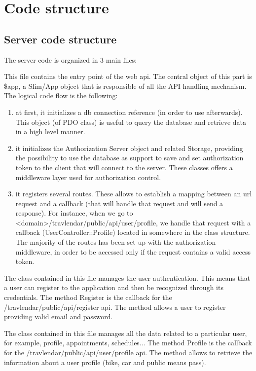 \chapter{Code structure}

\section{Server code structure}
The server code is organized in 3 main files:

This file contains the entry point of the web api. The central object of this part is \$app, a Slim/App object that is responsible of all the API handling mechanism. The logical code flow is the following:

\begin{enumerate}
\item at first, it initializes a db connection reference (in order to use afterwards). This object (of PDO class) is useful to query the database and retrieve data in a high level manner.
\item it initializes the Authorization Server object and related Storage, providing the possibility to use the database as support to save and set authorization token to the client that will connect to the server. These classes offers a middleware layer used for authorization control.
\item it registers several routes. These allows to establish a mapping between an url request and a callback (that will handle that request and will send a response). For instance, when we go to <domain>/travlendar/public/api/user/profile, we handle that request with a callback (UserController::Profile) located in somewhere in the class structure. The majority of the routes has been set up with the authorization middleware, in order to be accessed only if the request contains a valid access token.
\end{enumerate}

The class contained in this file manages the user authentication. This means that a user can register to the application and then be recognized through its credentials. The method Register is the callback for the /travlendar/public/api/register api. The method allows a user to register providing valid email and password.

The class contained in this file manages all the data related to a particular user, for example, profile, appointments, schedules... The method Profile is the callback for the /travlendar/public/api/user/profile api. The method allows to retrieve the information about a user profile (bike, car and public means pass).

